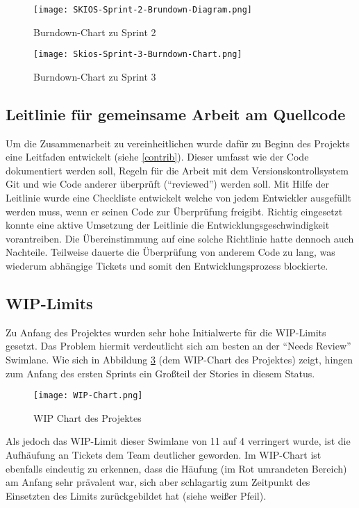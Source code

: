 \begin{figure}[H]
    \texttt{[image: SKIOS-Sprint-2-Brundown-Diagram.png]}
    \caption{Burndown-Chart zu Sprint 2}
    \label{fig:SKIOS-Sprint-2-Burndown}
\end{figure}

\begin{figure}
    \texttt{[image: Skios-Sprint-3-Burndown-Chart.png]}
    \caption{Burndown-Chart zu Sprint 3}
    \label{fig:SKIOS-Sprint-3-Burndown}
\end{figure}


\subsection{Leitlinie für gemeinsame Arbeit am Quellcode}
Um die Zusammenarbeit zu vereinheitlichen wurde dafür zu Beginn des Projekts eine Leitfaden entwickelt (siehe \ref{contrib}).
Dieser umfasst wie der Code dokumentiert werden soll, Regeln für die Arbeit mit dem Versionskontrollsystem Git 
und wie Code anderer überprüft (\enquote{reviewed}) werden soll. Mit Hilfe der Leitlinie wurde eine Checkliste entwickelt 
welche von jedem Entwickler ausgefüllt werden muss, wenn er seinen Code zur Überprüfung freigibt. Richtig
eingesetzt konnte eine aktive Umsetzung der Leitlinie die Entwicklungsgeschwindigkeit vorantreiben. Die 
Übereinstimmung auf eine solche Richtlinie hatte dennoch auch Nachteile. Teilweise dauerte die Überprüfung von 
anderem Code zu lang, was wiederum abhängige Tickets und somit den Entwicklungsprozess blockierte.

\subsection{WIP-Limits}
Zu Anfang des Projektes wurden sehr hohe Initialwerte für die \ac{WIP}-Limits gesetzt.
Das Problem hiermit verdeutlicht sich am besten an der \enquote{Needs Review} Swimlane.
Wie sich in Abbildung \ref{fig:WIP} (dem \ac{WIP}-Chart des Projektes) zeigt, hingen zum Anfang des ersten Sprints ein Großteil der Stories in diesem Status.

\begin{figure}
    \centering
    \texttt{[image: WIP-Chart.png]}
    \caption{WIP Chart des Projektes}
    \label{fig:WIP}
\end{figure}

Als jedoch das \ac{WIP}-Limit dieser Swimlane von 11 auf 4 verringert wurde, ist die Aufhäufung an Tickets dem Team deutlicher geworden.
Im \ac{WIP}-Chart ist ebenfalls eindeutig zu erkennen, dass die Häufung (im Rot umrandeten Bereich) am Anfang sehr prävalent war, sich aber schlagartig zum Zeitpunkt des Einsetzten des Limits zurückgebildet hat (siehe weißer Pfeil).

